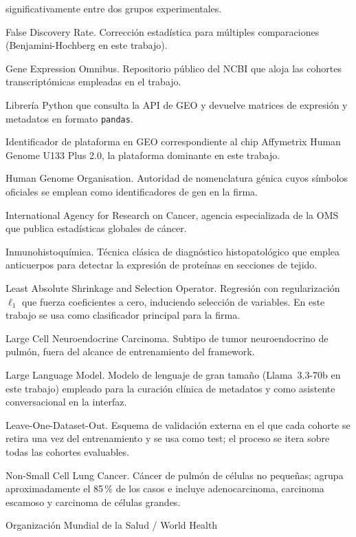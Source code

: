 \begin{description}
  significativamente entre dos grupos experimentales.
  \item[FDR] False Discovery Rate. Corrección estadística para múltiples
  comparaciones (Benjamini-Hochberg en este trabajo).
  \item[GEO] Gene Expression Omnibus. Repositorio público del NCBI que
  aloja las cohortes transcriptómicas empleadas en el trabajo.
  \item[GEOparse] Librería Python que consulta la API de GEO y devuelve
  matrices de expresión y metadatos en formato \texttt{pandas}.
  \item[GPL570] Identificador de plataforma en GEO correspondiente al
  chip Affymetrix Human Genome U133 Plus 2.0, la plataforma dominante
  en este trabajo.
  \item[HUGO] Human Genome Organisation. Autoridad de nomenclatura
  génica cuyos símbolos oficiales se emplean como identificadores de
  gen en la firma.
  \item[IARC] International Agency for Research on Cancer, agencia
  especializada de la OMS que publica estadísticas globales de cáncer.
  \item[IHC] Inmunohistoquímica. Técnica clásica de diagnóstico
  histopatológico que emplea anticuerpos para detectar la expresión de
  proteínas en secciones de tejido.
  \item[LASSO] Least Absolute Shrinkage and Selection Operator.
  Regresión con regularización $\ell_1$ que fuerza coeficientes a cero,
  induciendo selección de variables. En este trabajo se usa como
  clasificador principal para la firma.
  \item[LCNE] Large Cell Neuroendocrine Carcinoma. Subtipo de tumor
  neuroendocrino de pulmón, fuera del alcance de entrenamiento del
  framework.
  \item[LLM] Large Language Model. Modelo de lenguaje de gran tamaño
  (Llama~3.3-70b en este trabajo) empleado para la curación clínica de
  metadatos y como asistente conversacional en la interfaz.
  \item[LODO] Leave-One-Dataset-Out. Esquema de validación externa en el
  que cada cohorte se retira una vez del entrenamiento y se usa como
  test; el proceso se itera sobre todas las cohortes evaluables.
  \item[NSCLC] Non-Small Cell Lung Cancer. Cáncer de pulmón de células
  no pequeñas; agrupa aproximadamente el 85\,\% de los casos e incluye
  adenocarcinoma, carcinoma escamoso y carcinoma de células grandes.
  \item[OMS / WHO] Organización Mundial de la Salud / World Health

\end{description}
